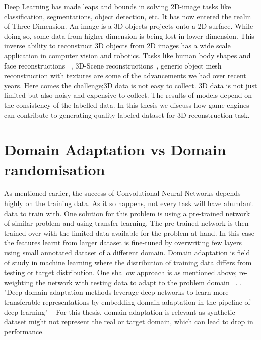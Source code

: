 Deep Learning has made leaps and bounds in solving 2D-image tasks like classification, segmentations, object detection, etc.
It has now entered the realm of Three-Dimension.
An image is a 3D objects projects onto a 2D-surface.
While doing so, some data from higher dimension is being lost in lower dimension.
This inverse ability to reconstruct 3D objects from 2D images has a wide scale application in computer vision and robotics.
Tasks like human body shapes and face reconstructions ~\cite{deng2019accurate,Guo20173DFaceNetRD,9210569,richardson20163d,Richardson2017LearningDF},
3D-Scene reconstructions~\cite{Denninger20203DSR,Song2017SemanticSC,LiSilhouetteAssisted3O,Shin20193DSR}, generic object mesh reconstruction with textures are some of the advancements we had over recent years.
Here comes the challenge;3D data is not easy to collect.
3D data is not just limited but also noisy and expensive to collect.
The results of models depend on the consistency of the labelled data.
In this thesis we discuss how game engines can contribute to generating quality labeled dataset for 3D reconstruction task.

\section{Domain Adaptation vs Domain randomisation} \label{sec:da vs dr}

As mentioned earlier, the success of Convolutional Neural Networks depends highly on the training data.
As it so happens, not every task will have abundant data to train with.
One solution for this problem is using a pre-trained network of similar problem and using transfer learning.
The pre-trained network is then trained over with the limited data available for the problem at hand.
In this case the features learnt from larger dataset is fine-tuned by overwriting few layers using small annotated dataset of a different domain.
Domain adaptation is field of study in machine learning where the distribution of training data differs from testing or target distribution.
One shallow approach is as mentioned above;
re-weighting the network with testing data to adapt to the problem domain ~\cite{Li2017PredictionRF}.
.
"Deep domain adaptation methods leverage deep networks to learn more transferable representations by embedding domain adaptation in the pipeline of
deep learning" ~\cite{DBLP:journals/corr/abs-1802-03601}
For this thesis, domain adaptation is relevant as synthetic dataset might not represent the real or target domain, which can lead to drop in performance.

